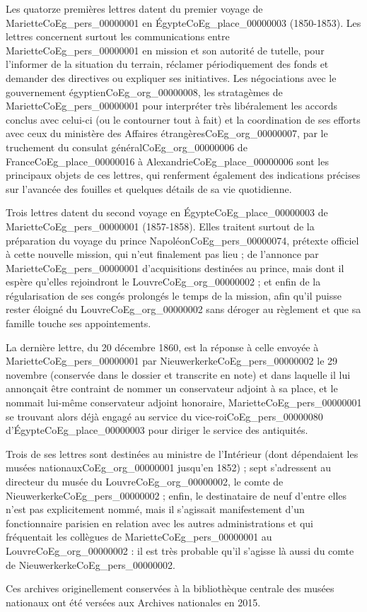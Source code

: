 \documentclass{book}
\begin{document}
Les quatorze premières lettres datent du premier voyage de Mariette\gls{CoEg_pers_00000001} en Égypte\gls{CoEg_place_00000003} (1850-1853). Les lettres concernent surtout les communications entre Mariette\gls{CoEg_pers_00000001} en mission et son autorité de tutelle, pour l’informer de la situation du terrain, réclamer périodiquement des fonds et demander des directives ou expliquer ses initiatives. Les négociations avec le gouvernement égyptien\gls{CoEg_org_00000008}, les stratagèmes de Mariette\gls{CoEg_pers_00000001} pour interpréter très libéralement les accords conclus avec celui-ci (ou le contourner tout à fait) et la coordination de ses efforts avec ceux du ministère des Affaires étrangères\gls{CoEg_org_00000007}, par le truchement du consulat général\gls{CoEg_org_00000006} de France\gls{CoEg_place_00000016} à Alexandrie\gls{CoEg_place_00000006} sont les principaux objets de ces lettres, qui renferment également des indications précises sur l’avancée des fouilles et quelques détails de sa vie quotidienne.\par
Trois lettres datent du second voyage en Égypte\gls{CoEg_place_00000003} de Mariette\gls{CoEg_pers_00000001} (1857-1858). Elles traitent surtout de la préparation du voyage du prince Napoléon\gls{CoEg_pers_00000074}, prétexte officiel à cette nouvelle mission, qui n’eut finalement pas lieu ; de l’annonce par Mariette\gls{CoEg_pers_00000001} d’acquisitions destinées au prince, mais dont il espère qu’elles rejoindront le Louvre\gls{CoEg_org_00000002} ; et enfin de la régularisation de ses congés prolongés le temps de la mission, afin qu'il puisse rester éloigné du Louvre\gls{CoEg_org_00000002} sans déroger au règlement et que sa famille touche ses appointements.\par
La dernière lettre, du 20 décembre 1860, est la réponse à celle envoyée à Mariette\gls{CoEg_pers_00000001} par Nieuwerkerke\gls{CoEg_pers_00000002} le 29 novembre (conservée dans le dossier et transcrite en note) et dans laquelle il lui annonçait être contraint de nommer un conservateur adjoint à sa place, et le nommait lui-même conservateur adjoint honoraire, Mariette\gls{CoEg_pers_00000001} se trouvant alors déjà engagé au service du vice-roi\gls{CoEg_pers_00000080} d’Égypte\gls{CoEg_place_00000003} pour diriger le service des antiquités.\par
Trois de ses lettres sont destinées au ministre de l’Intérieur (dont dépendaient les musées nationaux\gls{CoEg_org_00000001} jusqu’en 1852) ; sept s’adressent au directeur du musée du Louvre\gls{CoEg_org_00000002}, le comte de Nieuwerkerke\gls{CoEg_pers_00000002} ; enfin, le destinataire de neuf d’entre elles n’est pas explicitement nommé, mais il s’agissait manifestement d’un fonctionnaire parisien en relation avec les autres administrations et qui fréquentait les collègues de Mariette\gls{CoEg_pers_00000001} au Louvre\gls{CoEg_org_00000002} : il est très probable qu’il s’agisse là aussi du comte de Nieuwerkerke\gls{CoEg_pers_00000002}.\par
Ces archives originellement conservées à la bibliothèque centrale des musées nationaux ont été versées aux Archives nationales en 2015.
\end{document}
